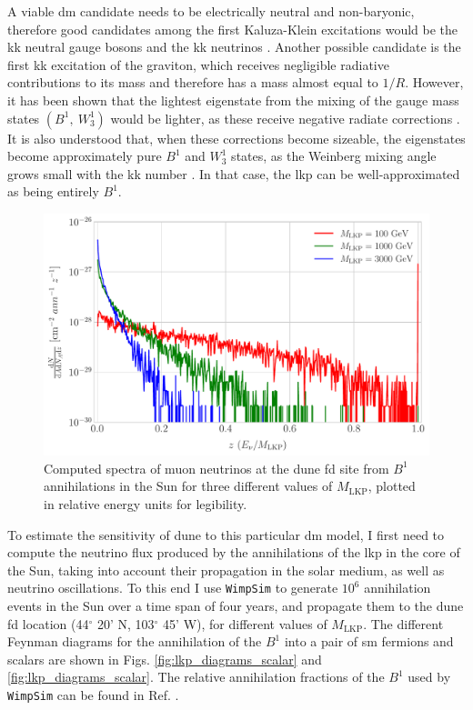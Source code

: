 A viable \gls{dm} candidate needs to be electrically neutral and non-baryonic, therefore good candidates among the first Kaluza-Klein excitations would be the \gls{kk} neutral gauge bosons and the \gls{kk} neutrinos \cite{Servant2002}. Another possible candidate is the first \gls{kk} excitation of the graviton, which receives negligible radiative contributions to its mass and therefore has a mass almost equal to $1/R$. However, it has been shown that the lightest eigenstate from the mixing of the gauge mass states $\left(B^{1},~ W_{3}^{1}\right)$ would be lighter, as these receive negative radiate corrections \cite{Cheng2002}. It is also understood that, when these corrections become sizeable, the eigenstates become approximately pure $B^{1}$ and $W_{3}^{1}$ states, as the Weinberg mixing angle grows small with the \gls{kk} number \cite{Cheng2002}. In that case, the \gls{lkp} can be well-approximated as being entirely $B^{1}$.

\begin{figure}[t]
	\centering
	\includegraphics[width=0.9\linewidth]{Images/DM_Analysis/KK_nu_flux}
	\caption[Computed spectra of muon neutrinos at the \gls{dune} \gls{fd} site from $B^{1}$ annihilations in the Sun for various values of $M_{\mathrm{LKP}}$.]{Computed spectra of muon neutrinos at the \gls{dune} \gls{fd} site from $B^{1}$ annihilations in the Sun for three different values of $M_{\mathrm{LKP}}$, plotted in relative energy units for legibility.}
	\label{fig:KK_nu_flux}
\end{figure}

To estimate the sensitivity of \gls{dune} to this particular \gls{dm} model, I first need to compute the neutrino flux produced by the annihilations of the \gls{lkp} in the core of the Sun, taking into account their propagation in the solar medium, as well as neutrino oscillations.  To this end I use \texttt{WimpSim} \cite{Blennow2007, WimpSim} to generate $10^{6}$ annihilation events in the Sun over a time span of four years, and propagate them to the \gls{dune} \gls{fd} location (44$^{\circ} $ 20' N, 103$^{\circ} $ 45' W), for different values of $M_{\mathrm{LKP}}$. The different Feynman diagrams for the annihilation of the $B^{1}$ into a pair of \gls{sm} fermions and scalars are shown in Figs. \ref{fig:lkp_diagrams_scalar} and \ref{fig:lkp_diagrams_scalar}. The relative annihilation fractions of the $B^{1}$ used by \texttt{WimpSim} can be found in Ref. \cite{Hooper2007}.

